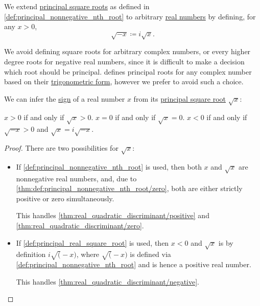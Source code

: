 \begin{definition}\label{def:principal_real_square_root}\mimprovised
  We extend \hyperref[def:semigroup_power]{principal square roots} as defined in \cref{def:principal_nonnegative_nth_root} to arbitrary \hyperref[def:real_numbers]{real numbers} by defining, for any \( x > 0 \),
  \begin{equation}\label{eq:def:principal_real_square_root/negative}
    \sqrt {-x} \coloneqq i \sqrt x.
  \end{equation}
\end{definition}
\begin{comments}
  \item We avoid defining square roots for arbitrary complex numbers, or every higher degree roots for negative real numbers, since it is difficult to make a decision which root should be principal. \Textcite[16]{Маркушевич1967АналитическиеФункцииТом1} defines principal roots for any complex number based on their \hyperref[def:complex_numbers_trigonometric_form]{trigonometric form}, however we prefer to avoid such a choice.
\end{comments}

\begin{proposition}\label{thm:principal_real_square_root_sign}
  We can infer the \hyperref[def:signum]{sign} of a real number \( x \) from its \hyperref[def:principal_real_square_root]{principal square root} \( \sqrt x \):
  \begin{thmenum}
     \( x > 0 \) if and only if \( \sqrt x > 0 \).
     \( x = 0 \) if and only if \( \sqrt x = 0 \).
     \( x < 0 \) if and only if \( \sqrt{-x} > 0 \) and \( \sqrt x = i \sqrt{-x} \).
  \end{thmenum}
\end{proposition}
\begin{proof}
  There are two possibilities for \( \sqrt x \):
  \begin{itemize}
    \item If \cref{def:principal_nonnegative_nth_root} is used, then both \( x \) and \( \sqrt x \) are nonnegative real numbers, and, due to \cref{thm:def:principal_nonnegative_nth_root/zero}, both are either strictly positive or zero simultaneously.

    This handles \cref{thm:real_quadratic_discriminant/positive} and \cref{thm:real_quadratic_discriminant/zero}.

    \item If \cref{def:principal_real_square_root} is used, then \( x < 0 \) and \( \sqrt x \) is by definition \( i \sqrt (-x) \), where \( \sqrt (-x) \) is defined via \cref{def:principal_nonnegative_nth_root} and is hence a positive real number.

    This handles \cref{thm:real_quadratic_discriminant/negative}.
  \end{itemize}
\end{proof}

